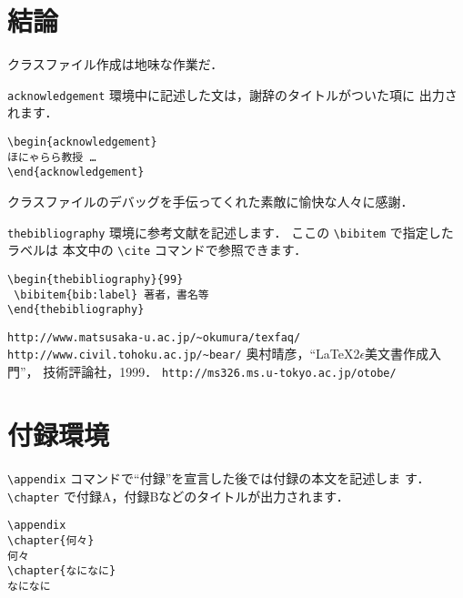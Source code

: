 \documentclass[mingoth]{knct-paper}		%
\begin{document}

\chapter{結論}
クラスファイル作成は地味な作業だ．


\begin{acknowledgement}
 \verb|acknowledgement| 環境中に記述した文は，謝辞のタイトルがついた項に
 出力されます．
\begin{verbatim}
\begin{acknowledgement}
ほにゃらら教授 …
\end{acknowledgement}
\end{verbatim}

 クラスファイルのデバッグを手伝ってくれた素敵に愉快な人々に感謝．
\end{acknowledgement}


\begin{thebibliography}{99}
  \verb|thebibliography| 環境に参考文献を記述します．
 		 ここの \verb|\bibitem| で指定したラベルは
		 本文中の \verb|\cite| コマンドで参照できます．
\begin{verbatim}
\begin{thebibliography}{99}
 \bibitem{bib:label} 著者，書名等
\end{thebibliography}
\end{verbatim}
                 
  \verb|http://www.matsusaka-u.ac.jp/~okumura/texfaq/|
  \verb|http://www.civil.tohoku.ac.jp/~bear/|
  奥村晴彦，``\LaTeX2$\epsilon$美文書作成入門''，
		 技術評論社，1999．
  \verb|http://ms326.ms.u-tokyo.ac.jp/otobe/|
\end{thebibliography}


\appendix

\chapter{付録環境}
\verb|\appendix| コマンドで``付録''を宣言した後では付録の本文を記述しま
す．\verb|\chapter| で付録A，付録Bなどのタイトルが出力されます．
\begin{verbatim}
\appendix
\chapter{何々}
何々
\chapter{なになに}
なになに
\end{verbatim}
\end{document}
